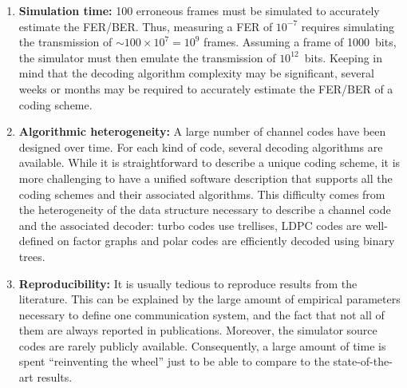 \begin{enumerate}
  \item \textbf{Simulation time:}
    100 erroneous frames must be simulated to accurately estimate the FER/BER.
    Thus, measuring a FER of $10^{-7}$ requires simulating the transmission of
    $\sim100\times 10^7=10^9$ frames. Assuming a frame of 1000~bits, the
    simulator must then emulate the transmission of $10^{12}$~bits. Keeping in
    mind that the decoding algorithm complexity may be significant, several
    weeks or months may be required to accurately estimate the FER/BER of a
    coding scheme.

  \item \textbf{Algorithmic heterogeneity:} A large number of channel codes have
    been designed over time. For each kind of code, several decoding algorithms
    are available. While it is straightforward to describe a unique coding
    scheme, it is more challenging to have a unified software description that
    supports all the coding schemes and their associated algorithms. This
    difficulty comes from the heterogeneity of the data structure necessary to
    describe a channel code and the associated decoder: turbo codes use
    trellises, LDPC codes are well-defined on factor graphs and polar codes are
    efficiently decoded using binary trees.

  \item \textbf{Reproducibility:} It is usually tedious to reproduce results
    from the literature. This can be explained by the large amount of empirical
    parameters necessary to define one communication system, and the fact that
    not all of them are always reported in publications. Moreover, the simulator
    source codes are rarely publicly available. Consequently, a large amount of
    time is spent ``reinventing the wheel'' just to be able to compare to the
    state-of-the-art results.
\end{enumerate}


